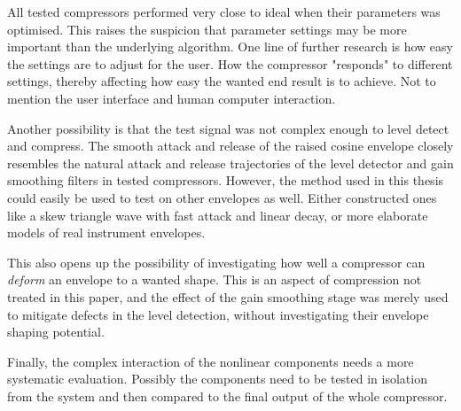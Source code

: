 \documentclass[../main2.tex]{subfiles}
\begin{document}
All tested compressors performed very close to ideal when their parameters was optimised. This raises the suspicion that parameter settings may be more important than the underlying algorithm. One line of further research is how easy the settings are to adjust for the user. How the compressor "responds" to different settings, thereby affecting how easy the wanted end result is to achieve. Not to mention the user interface and human computer interaction.

Another possibility is that the test signal was not complex enough to level detect and compress. The smooth attack and release of the raised cosine envelope closely resembles the natural attack and release trajectories of the level detector and gain smoothing filters in tested compressors. However, the method used in this thesis could easily be used to test on other envelopes as well. Either constructed ones like a skew triangle wave with fast attack and linear decay, or more elaborate models of real instrument envelopes.

This also opens up the possibility of investigating how well a compressor can \emph{deform} an envelope to a wanted shape. This is an aspect of compression not treated in this paper, and the effect of the gain smoothing stage was merely used to mitigate defects in the level detection, without investigating their envelope shaping potential.

Finally, the complex interaction of the nonlinear components needs a more systematic evaluation. Possibly the components need to be tested in isolation from the system and then compared to the final output of the whole compressor.  
\end{document}
